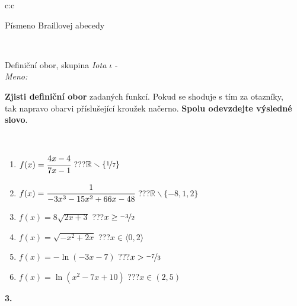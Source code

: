 \documentclass[10pt]{report}
\begin{document}
\begin{tabular}{c:c}
\begin{minipage}[c][104.5mm][t]{0.5\linewidth}
\begin{center}
\begin{minipage}{0.20\linewidth}
\begin{center}
{\small Písmeno Braillovej abecedy}
\end{center}
\end{minipage}
\end{center}
\end{minipage}
\\ \hdashline
\begin{minipage}[c][104.5mm][t]{0.5\linewidth}
\begin{center}
\vspace{7mm}
{\huge Definiční obor, skupina \textit{Iota $\iota$} -}\\[5mm]
\textit{Meno:}\phantom{xxxxxxxxxxxxxxxxxxxxxxxxxxxxxxxxxxxxxxxxxxxxxxxxxxxxxxxxxxxxxxxxx}\\[5mm]
\begin{minipage}{0.95\linewidth}
\textbf{Zjisti definiční obor} zadaných funkcí. Pokud se shoduje s tím za otazníky,\\tak napravo obarvi příslušející kroužek načerno. \textbf{Spolu odevzdejte výsledné slovo}.
\end{minipage}
\\[1mm]
\begin{minipage}{0.79\linewidth}
\begin{center}
\begin{varwidth}{\linewidth}
\begin{enumerate}
\normalsizerrr
\item $f(x)=\cfrac{4x-4}{7x-1}$\quad \dotfill\; ???\;\dotfill \quad $\mathbb{R}\smallsetminus\{\nicefrac{1}{7}\}$
\item $f(x)=\cfrac{1}{-3x^3-15x^2+66x-48}$\quad \dotfill\; ???\;\dotfill \quad $\mathbb{R}\smallsetminus\{-8,1,2\}$
\item $f(x)=8\sqrt{2x+3}$\quad \dotfill\; ???\;\dotfill \quad $x\geq\nicefrac{-3}{2}$
\item $f(x)=\sqrt{-x^2+2x}$\quad \dotfill\; ???\;\dotfill \quad $x\in\langle0 , 2\rangle$
\item $f(x)=-\ln{(-3x-7)}$\quad \dotfill\; ???\;\dotfill \quad $x>\nicefrac{-7}{3}$
\item $f(x)=\ln{(x^2-7x+10)}$\quad \dotfill\; ???\;\dotfill \quad $x\in(2 , 5)$
\end{enumerate}
\end{varwidth}
\end{center}
\end{minipage}
\begin{minipage}{0.20\linewidth}
\begin{center}
{\Huge\bfseries 3.} \\[2mm]

\end{center}
\end{minipage}
\end{center}
\end{minipage}
\end{tabular}
\end{document}
